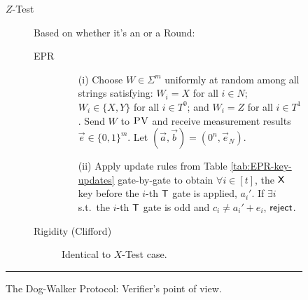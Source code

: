 \documentclass[11pt,letter]{article}
\theoremstyle{remark}
\theoremstyle{definition}
\newcommand{\rigid}{\textsc{rigid}}
\newcommand{\pv}{\textsc{PV}}
\begin{document}
\begin{figure}[H]
\begin{description}
\item[$Z$-Test] Based on whether it's an  or a  Round:
\begin{description}
	\item[EPR] 
	\begin{enumerate}
		\item[(i)] Choose $W\in\Sigma^m$ uniformly at random among all strings satisfying: $W_i=X$ for all $i\in N$; $W_i\in\{X,Y\}$ for all $i\in T^0$; and $W_i=Z$ for all $i\in T^1$. Send $W$ to $\pv$ and receive measurement results $\vec{e}\in\{0,1\}^m$. Let $(\vec{a},\vec{b})=(0^n,\vec{e}_N)$.
		\item[(ii)] Apply update rules from Table \ref{tab:EPR-key-updates} gate-by-gate to obtain $\forall i\in [t]$, the $\sf X$ key before the $i$-th $\sf T$ gate is applied, $a_i'$. 
If $\exists i$ s.t.\ the $i$-th $\sf T$ gate is odd and $c_i\neq a_i'+e_i$, $\sf reject$. %
	\end{enumerate}
	\item[Rigidity (Clifford)] Identical to $X$-Test case.%
\end{description}
\end{description}
\rule[2ex]{16.5cm}{0.5pt}\vspace{-.5cm}
\caption{The Dog-Walker Protocol: Verifier's point of view.}\label{fig:dogwalker-protocol-V}
\end{figure}
\end{document}
